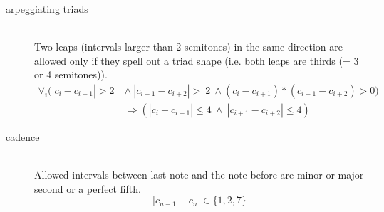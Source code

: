 \documentclass[11pt]{article} %
\begin{document}
\begin{description}
\item[arpeggiating triads] \hfill\\
Two leaps (intervals larger than 2 semitones) in the same direction are allowed only if they spell out a triad shape (i.e. both leaps are thirds (= 3 or 4 semitones)).
\begin{align*}
\forall_{i} (|c_{i} - c_{i+1}| > 2\ &\land\ |c_{i+1} - c_{i+2}| >\ 2\ \land (c_{i} - c_{i+1})*(c_{i+1} - c_{i+2}) > 0) \\ 
&\Rightarrow (|c_{i} - c_{i+1}| \leq 4\ \land\ |c_{i+1} - c_{i+2}| \leq 4)
\end{align*}

\item[cadence] \hfill\\
Allowed intervals between last note and the note before are minor or major second or a perfect fifth.
$$|c_{n-1} - c_{n}| \in \{1,2,7\}$$
\end{description}
\end{document}
